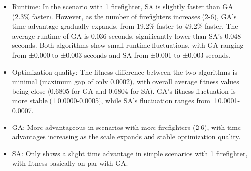 \begin{itemize}
    \item Runtime: In the scenario with 1 firefighter, SA is slightly faster than GA (2.3\% faster). However, as the number of firefighters increases (2-6), GA's time advantage gradually expands, from 19.2\% faster to 49.2\% faster. The average runtime of GA is 0.036 seconds, significantly lower than SA's 0.048 seconds. Both algorithms show small runtime fluctuations, with GA ranging from ±0.000 to ±0.003 seconds and SA from ±0.001 to ±0.003 seconds.
    \item Optimization quality: The fitness difference between the two algorithms is minimal (maximum gap of only 0.0002), with overall average fitness values being close (0.6805 for GA and 0.6804 for SA). GA's fitness fluctuation is more stable (±0.0000-0.0005), while SA's fluctuation ranges from ±0.0001-0.0007.
    \item GA: More advantageous in scenarios with more firefighters (2-6), with time advantages increasing as the scale expands and stable optimization quality.
    \item SA: Only shows a slight time advantage in simple scenarios with 1 firefighter, with fitness basically on par with GA.
\end{itemize}


